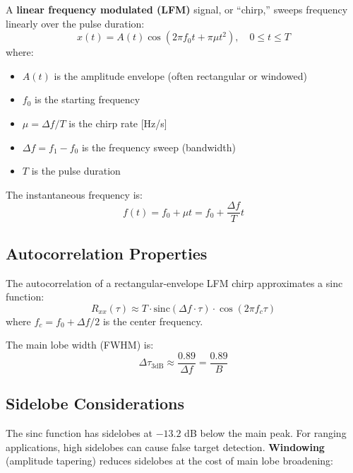 \documentclass[11pt]{article}
\begin{document}
A \textbf{linear frequency modulated (LFM)} signal, or ``chirp,'' sweeps frequency linearly over the pulse duration:
\begin{equation}
x(t) = A(t) \cos\left(2\pi f_0 t + \pi \mu t^2\right), \quad 0 \leq t \leq T
\end{equation}
where:
\begin{itemize}
    \item $A(t)$ is the amplitude envelope (often rectangular or windowed)
    \item $f_0$ is the starting frequency
    \item $\mu = \Delta f / T$ is the chirp rate [Hz/s]
    \item $\Delta f = f_1 - f_0$ is the frequency sweep (bandwidth)
    \item $T$ is the pulse duration
\end{itemize}

The instantaneous frequency is:
\begin{equation}
f(t) = f_0 + \mu t = f_0 + \frac{\Delta f}{T} t
\end{equation}

\subsection{Autocorrelation Properties}

The autocorrelation of a rectangular-envelope LFM chirp approximates a sinc function:
\begin{equation}
R_{xx}(\tau) \approx T \cdot \text{sinc}(\Delta f \cdot \tau) \cdot \cos(2\pi f_c \tau)
\end{equation}
where $f_c = f_0 + \Delta f/2$ is the center frequency.

The main lobe width (FWHM) is:
\begin{equation}
\Delta \tau_{3\text{dB}} \approx \frac{0.89}{\Delta f} = \frac{0.89}{B}
\end{equation}

\subsection{Sidelobe Considerations}

The sinc function has sidelobes at $-13.2$ dB below the main peak. For ranging applications, high sidelobes can cause false target detection. \textbf{Windowing} (amplitude tapering) reduces sidelobes at the cost of main lobe broadening:
\end{document}
